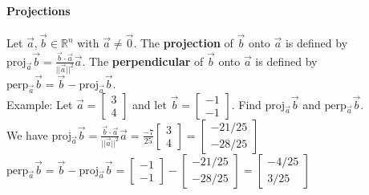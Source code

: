 \documentclass[10pt,letter]{article}
\begin{document}
\paragraph{Projections} Let $\vec{a},\vec{b}\in\mathbb{R}^n$ with $\vec{a}\neq\vec{0}$. The \textbf{projection} of $\vec{b}$ onto $\vec{a}$ is defined by $\text{proj}_{\vec{a}}\vec{b}=\frac{\vec{b}\cdot\vec{a}}{||\vec{a}||^2}\vec{a}$. The \textbf{perpendicular} of $\vec{b}$ onto $\vec{a}$ is defined by $\text{perp}_{\vec{a}}\vec{b}=\vec{b}-\text{proj}_{\vec{a}}\vec{b}$. \\ 
Example: Let $\vec{a}=\begin{bmatrix}3\\4\end{bmatrix}$ and let $\vec{b}=\begin{bmatrix}-1\\-1\end{bmatrix}$. Find $\text{proj}_{\vec{a}}\vec{b}$ and $\text{perp}_{\vec{a}}\vec{b}$. \\ 
We have $\text{proj}_{\vec{a}}\vec{b}=\frac{\vec{b}\cdot\vec{a}}{||\vec{a}||^2}\vec{a}=\frac{-7}{25}\begin{bmatrix}3\\4\end{bmatrix}=\begin{bmatrix}-21/25\\-28/25\end{bmatrix}$\\ 
$\text{perp}_{\vec{a}}\vec{b}=\vec{b}-\text{proj}_{\vec{a}}\vec{b}=\begin{bmatrix}-1\\-1\end{bmatrix}-\begin{bmatrix}-21/25\\-28/25\end{bmatrix}=\begin{bmatrix}-4/25\\3/25\end{bmatrix}$
\end{document}
